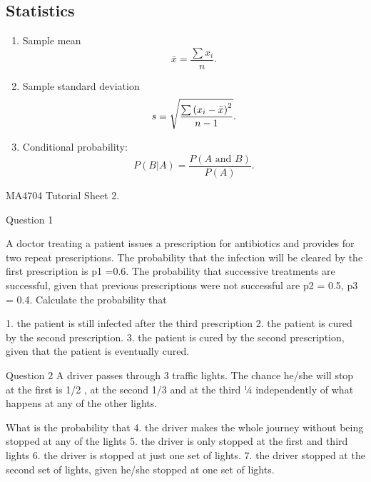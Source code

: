 \documentclass[12pt]{report}
\begin{document}
\subsection{Statistics}

\begin{enumerate}
	\item Sample mean
	\begin{equation*}
	\bar{x}=\frac{\sum x_{i}}{n}.
	\end{equation*}
	
	\item Sample standard deviation
	\begin{equation*}
	s=\sqrt{\frac{\sum \left( x_{i}-\bar{x}\right) ^{2}}{%
			n-1}}.
	\end{equation*}
	
	\item Conditional probability:
	\begin{equation*}
	P(B|A)=\frac{P\left( A\text{ and }B\right) }{P\left( A\right) }.
	\end{equation*}
	
	
	
	
	
	
\end{enumerate}
MA4704 Tutorial Sheet 2. 


Question 1

A doctor treating a patient issues a prescription for antibiotics and provides for two repeat prescriptions. The probability that the infection will be cleared by the first prescription is p1 =0.6. 
The probability that successive treatments are successful, given that previous prescriptions were not successful are p2 = 0.5, p3 = 0.4. Calculate the probability that  

1.	the patient is still infected after the third prescription
2.	the patient is cured by the second prescription.
3.	the patient is cured by the second prescription, given that the patient is eventually cured.


Question 2
A driver passes through 3 traffic lights. The chance he/she will stop at the first is 1/2 , at the second 1/3 and at the third ¼ independently of what happens at any of the other lights. 

What is the probability that
4.	the driver makes the whole journey without being stopped at any of the lights
5.	the driver is only stopped at the first and third lights
6.	the driver is stopped at just one set of lights.
7.	the driver stopped at the second set of lights, given he/she stopped at one set of lights.
\end{document}
